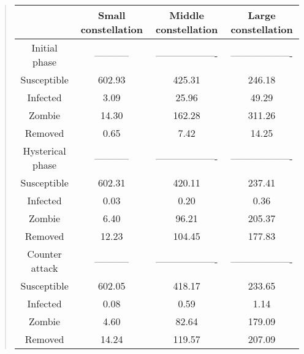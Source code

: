 \documentclass[%
twoside,                 %
final,                   %
chapterprefix=true,      %
open=right               %
10pt]{book}
\begin{document}






\label{table:compare_towns}

\begin{quote}
\begin{tabular}{cccc}
\hline
\multicolumn{1}{c}{  } & \multicolumn{1}{c}{ Small constellation } & \multicolumn{1}{c}{ Middle constellation } & \multicolumn{1}{c}{ Large constellation } \\
\hline
Initial phase    & -----------         & -------------------  & ------------------- \\
\hline
Susceptible      & 602.93              & 425.31               & 246.18              \\
Infected         & 3.09                & 25.96                & 49.29               \\
Zombie           & 14.30               & 162.28               & 311.26              \\
Removed          & 0.65                & 7.42                 & 14.25               \\
\hline
Hysterical phase & -----------         & -------------------  & ------------------- \\
\hline
Susceptible      & 602.31              & 420.11               & 237.41              \\
Infected         & 0.03                & 0.20                 & 0.36                \\
Zombie           & 6.40                & 96.21                & 205.37              \\
Removed          & 12.23               & 104.45               & 177.83              \\
\hline
Counter attack   & -----------         & -------------------  & ------------------- \\
\hline
Susceptible      & 602.05              & 418.17               & 233.65              \\
Infected         & 0.08                & 0.59                 & 1.14                \\
Zombie           & 4.60                & 82.64                & 179.09              \\
Removed          & 14.24               & 119.57               & 207.09              \\
\hline
\end{tabular}
\end{quote}
\end{document}
